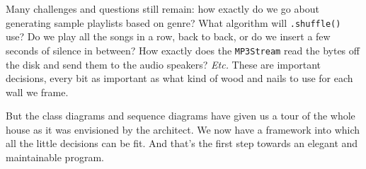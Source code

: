 Many challenges and questions still remain: how exactly do we go about
generating sample playlists based on genre? What algorithm will
\texttt{.shuffle()} use? Do we play all the songs in a row, back to back, or
do we insert a few seconds of silence in between? How exactly does the
\texttt{MP3Stream} read the bytes off the disk and send them to the audio
speakers? \textit{Etc.} These are important decisions, every bit as important
as what kind of wood and nails to use for each wall we frame. 

But the class diagrams and sequence diagrams have given us a tour of the whole
house as it was envisioned by the architect. We now have a framework into
which all the little decisions can be fit. And that's the first step towards
an elegant and maintainable program.


